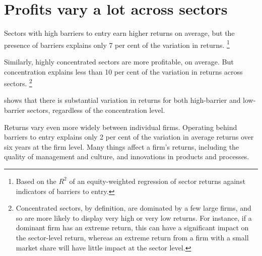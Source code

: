 
\newpage

\section{Profits vary a lot across sectors}

Sectors with high barriers to entry earn higher returns on average, but the presence of barriers explains only 7 per cent of the variation in returns.%
    \footnote{Based on the \(R^{2}\) of an equity-weighted regression of sector returns against indicators of barriers to entry.}

Similarly, highly concentrated sectors are more profitable, on average. But concentration explains less than 10 per cent of the variation in returns across sectors.%
    \footnote{Concentrated sectors, by definition, are dominated by a few large firms, and so are more likely to display very high or very low returns.
    For instance, if a dominant firm has an extreme return, this can have a significant impact on the sector-level return, whereas an extreme return from a firm with a small market share will have little impact at the sector level.}
    
 shows that there is substantial variation in returns for both high-barrier and low-barrier sectors, regardless of the concentration level.

Returns vary even more widely between individual firms. Operating behind barriers to entry explains only 2 per cent of the variation in average returns over six years at the firm level. Many things affect a firm's returns, including the quality of management and culture, and  innovations in products and processes.

